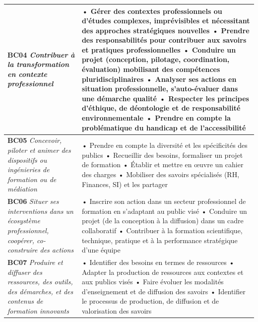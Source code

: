\documentclass[12pt,a4paper]{report}
\begin{document}
{\begin{longtable}{|p{4cm}|p{10.5cm}|}
\textbf{BC04} \newline
\textit{Contribuer à la transformation en contexte professionnel} &
• Gérer des contextes professionnels ou d'études complexes, imprévisibles et nécessitant des approches stratégiques nouvelles \newline
• Prendre des responsabilités pour contribuer aux savoirs et pratiques professionnelles \newline
• Conduire un projet (conception, pilotage, coordination, évaluation) mobilisant des compétences pluridisciplinaires \newline
• Analyser ses actions en situation professionnelle, s'auto-évaluer dans une démarche qualité \newline
• Respecter les principes d'éthique, de déontologie et de responsabilité environnementale \newline
• Prendre en compte la problématique du handicap et de l'accessibilité \\
\hline

\textbf{BC05} \newline
\textit{Concevoir, piloter et animer des dispositifs ou ingénieries de formation ou de médiation} &
• Prendre en compte la diversité et les spécificités des publics \newline
• Recueillir des besoins, formaliser un projet de formation \newline
• Établir et mettre en œuvre un cahier des charges \newline
• Mobiliser des savoirs spécialisés (RH, Finances, SI) et les partager \\
\hline

\textbf{BC06} \newline
\textit{Situer ses interventions dans un écosystème professionnel, coopérer, co-construire des actions} &
• Inscrire son action dans un secteur professionnel de formation en s'adaptant au public visé \newline
• Conduire un projet (de la conception à la diffusion) dans un cadre collaboratif \newline
• Contribuer à la formation scientifique, technique, pratique et à la performance stratégique d'une équipe \\
\hline

\textbf{BC07} \newline
\textit{Produire et diffuser des ressources, des outils, des démarches, et des contenus de formation innovants} &
• Identifier des besoins en termes de ressources \newline
• Adapter la production de ressources aux contextes et aux publics visés \newline
• Faire évoluer les modalités d'enseignement et de diffusion des savoirs \newline
• Identifier le processus de production, de diffusion et de valorisation des savoirs \\
\hline


\end{longtable}}
\end{document}
